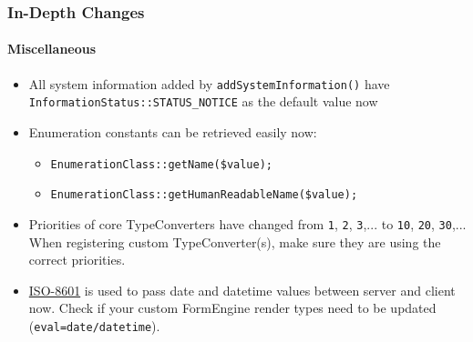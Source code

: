 \begin{frame}[fragile]
	\frametitle{In-Depth Changes}
	\framesubtitle{Miscellaneous}


	\begin{itemize}
		\item All system information added by \texttt{addSystemInformation()} have
			\texttt{InformationStatus::STATUS\_NOTICE} as the default value now
		\item Enumeration constants can be retrieved easily now:

			\begin{itemize}
				\item \texttt{EnumerationClass::getName(\$value);}
				\item \texttt{EnumerationClass::getHumanReadableName(\$value);}
			\end{itemize}

		\item Priorities of core TypeConverters have changed from\newline
			\texttt{1}, \texttt{2}, \texttt{3},... to \texttt{10}, \texttt{20}, \texttt{30},...
			When registering custom TypeConverter(s), make sure they are using the correct priorities.

		\item \href{https://en.wikipedia.org/wiki/ISO_8601}{ISO-8601} is used to pass date and datetime
			values between server and client now. Check if your custom FormEngine render types need to
			be updated (\texttt{eval=date/datetime}).

	\end{itemize}

\end{frame}












